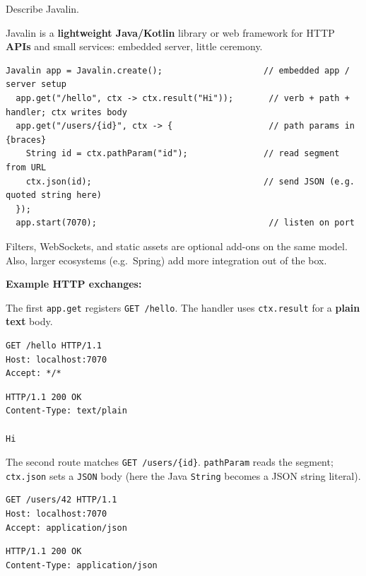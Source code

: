 \question[4]
Describe Javalin.
\makeemptybox{1.00in}
\begin{solution}
  Javalin is a \textbf{lightweight Java/Kotlin} library or web framework for HTTP \textbf{APIs} and small services: embedded server, little ceremony.

  \begin{lstlisting}[style=javaexam]
  Javalin app = Javalin.create();                    // embedded app / server setup
  app.get("/hello", ctx -> ctx.result("Hi"));       // verb + path + handler; ctx writes body
  app.get("/users/{id}", ctx -> {                   // path params in {braces}
    String id = ctx.pathParam("id");               // read segment from URL
    ctx.json(id);                                  // send JSON (e.g. quoted string here)
  });
  app.start(7070);                                  // listen on port
  \end{lstlisting}
  Filters, WebSockets, and static assets are optional add-ons on the same model. Also, larger ecosystems (e.g.\ Spring) add more integration out of the box. 

  \noindent\textbf{Example HTTP exchanges:}\par
  \noindent The first \texttt{app.get} registers \texttt{GET /hello}. The handler uses \texttt{ctx.result} for a \textbf{plain text} body.\par
  \begin{httpexchange}
\begin{lstlisting}[style=http]
GET /hello HTTP/1.1
Host: localhost:7070
Accept: */*

\end{lstlisting}
\httpmidarrows
\begin{lstlisting}[style=http]
HTTP/1.1 200 OK
Content-Type: text/plain

Hi
\end{lstlisting}
  \end{httpexchange}

  \noindent The second route matches \texttt{GET /users/\{id\}}. \texttt{pathParam} reads the segment; \texttt{ctx.json} sets a \texttt{JSON} body (here the Java \texttt{String} becomes a JSON string literal).\par
  \begin{httpexchange}
\begin{lstlisting}[style=http]
GET /users/42 HTTP/1.1
Host: localhost:7070
Accept: application/json

\end{lstlisting}
\httpmidarrows
\begin{lstlisting}[style=http]
HTTP/1.1 200 OK
Content-Type: application/json


\end{lstlisting}
\end{httpexchange}
\end{solution}
